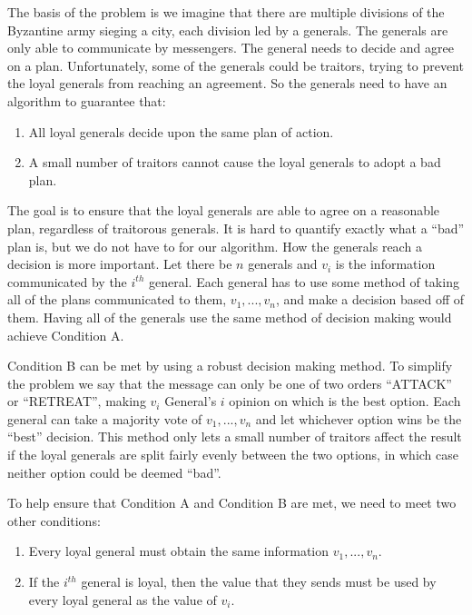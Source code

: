 \documentclass[10pt]{amsart}
\begin{document}
The basis of the problem is we imagine that there are multiple divisions of the Byzantine army sieging
a city, each division led by a generals. The generals are only able to communicate by messengers. The
general needs to decide and agree on a plan. Unfortunately, some of the generals could be traitors,
trying to prevent the loyal generals from reaching an agreement. So the generals need  to have an
algorithm to guarantee that:

\begin{enumerate}[label={\Alph*.}]
    \item All loyal generals decide upon the same plan of action.
    \item A small number of traitors cannot cause the loyal generals to adopt a bad plan.
\end{enumerate}

The goal is to ensure that the loyal generals are able to agree on a reasonable plan, regardless
of traitorous generals. It is hard to quantify exactly what a ``bad'' plan is, but we do not have to
for our algorithm. How the generals reach a decision is more important. Let there be $n$ generals
and $v_i$ is the information communicated by the $i^{th}$ general. Each general has to use some method
of taking all of the plans communicated to them, $v_1,...,v_n$, and make a decision based off of them.
Having all of the generals use the same method of decision making would achieve Condition A.

Condition B can be met by using a robust decision making method. To simplify the problem we say that
the message can only be one of two orders ``ATTACK'' or ``RETREAT'', making $v_i$ General's $i$
opinion on which is the best option. Each general can take a majority vote of $v_1,...,v_n$ and let
whichever option wins be the ``best'' decision. This method only lets a small number of traitors
affect the result if the loyal generals are split fairly evenly between the two options, in which
case neither option could be deemed ``bad''. 

\pagebreak

To help ensure that Condition A and Condition B are met, we need to meet two other conditions:

\begin{enumerate}[label={\arabic{enumi}.}]
    \item Every loyal general must obtain the same information $v_1,...,v_n$.
    \item {
        If the $i^{th}$ general is loyal, then the value that they sends must be used by every loyal 
        general as the value of $v_i$.
    }
\end{enumerate}
\end{document}
